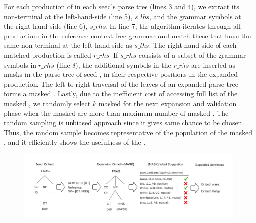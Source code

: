 


For each production of in each seed's parse tree (lines 3 and 4), we
extract its non-terminal at the left-hand-side (line 5), $s\_lhs$, and
the grammar symbols at the right-hand-side (line 6), $s\_rhs$. In line
7, the algorithm iterates through all productions in the reference
context-free grammar and match these that have the same non-terminal
at the left-hand-side as $s\_lhs$.  The right-hand-side of each
matched production is called $r\_rhs$.  If $s\_rhs$ consists of a
subset of the grammar symbols in $r\_rhs$ (line 8), the additional
symbols in the $r\_rhs$ are inserted as masks in the parse tree of
seed \sent, in their respective positions in the expanded production.
The left to right traversal of the leaves of an expanded parse tree
forms a masked \sent.  Lastly, due to the inefficient cost of
accessing full list of the masked \sents, we randomly select $k$
masked \sents for the next \sent expansion and validation phase when
the masked \sents are more than maximum number of masked \sents. The
random sampling is unbiased approach since it gives same chance to be
chosen. Thus, the random sample becomes representative of the
population of the masked \sents, and it efficiently shows the
usefulness of the \tool.   

\begin{figure}[t]
  \centering
  \includegraphics[scale=0.7]{figs/running_example.pdf}
  \caption{\RunningExCaption}
\end{figure}

